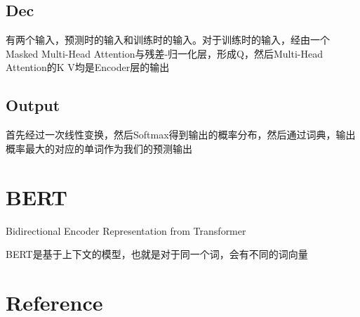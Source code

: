\documentclass[a4paper]{article}
\begin{document}
\begin{sloppypar}
      \subsection{Dec}
      有两个输入，预测时的输入和训练时的输入。对于训练时的输入，经由一个Masked Multi-Head Attention与残差-归一化层，形成Q，然后Multi-Head Attention的K V均是Encoder层的输出
      \subsection{Output}
      首先经过一次线性变换，然后Softmax得到输出的概率分布，然后通过词典，输出概率最大的对应的单词作为我们的预测输出

      \section{BERT}

      Bidirectional Encoder Representation from Transformer


      BERT是基于上下文的模型，也就是对于同一个词，会有不同的词向量

      \newpage
      \section{Reference}

      \nocite{*} %

      
      

\end{sloppypar}
\end{document}
